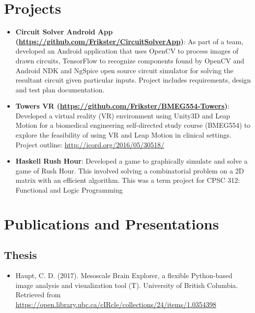 \documentclass[11pt,a4paper,sans]{moderncv}        %
\begin{document}
\section{Projects}
  \begin{itemize} 
      \item\textbf{Circuit Solver Android App (\href{https://github.com/Frikster/CircuitSolverApp}{https://github.com/Frikster/CircuitSolverApp})}:
      {As part of a team, developed an Android application that uses OpenCV to process images of drawn circuits, TensorFlow to recognize components found by OpenCV and Android NDK and NgSpice open source circuit simulator for solving the resultant circuit given particular inputs. Project includes requirements, design and test plan documentation.}
    \item\textbf{Towers VR (\href{https://github.com/Frikster/BMEG554-Towers}{https://github.com/Frikster/BMEG554-Towers})}:
      {Developed a virtual reality (VR) environment using Unity3D and Leap Motion for a biomedical engineering self-directed study course (BMEG554) to explore the feasibility of using VR and Leap Motion in clinical settings. Project outline: \href{http://icord.org/2016/05/30518/}{http://icord.org/2016/05/30518/} }
    \item\textbf{Haskell Rush Hour}: {Developed a game to graphically simulate and solve a game of Rush Hour. This involved solving a combinatorial problem on a 2D matrix with an efficient algorithm. This was a term project for CPSC 312: Functional and Logic Programming}
  \end{itemize}
  
\section{Publications and Presentations}
\subsection{Thesis}
\begin{itemize}
\item Haupt, C. D. (2017). Mesoscale Brain Explorer, a flexible Python-based image analysis and visualization tool (T). University of British Columbia. Retrieved from \href{https://open.library.ubc.ca/cIRcle/collections/24/items/1.0354398}{https://open.library.ubc.ca/cIRcle/collections/24/items/1.0354398}
\end{itemize}
\vspace{5pt}
\end{document}
